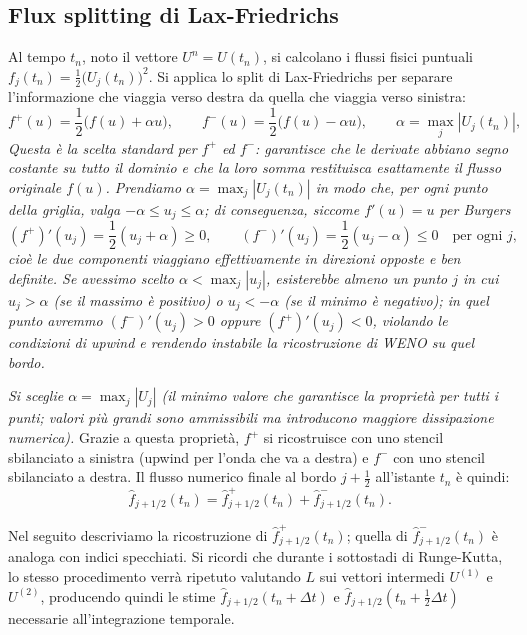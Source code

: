 \documentclass[12pt]{article}
\begin{document}
\subsection{Flux splitting di Lax-Friedrichs}

Al tempo \(t_n\), noto il vettore \(U^n = U(t_n)\), si calcolano i flussi fisici puntuali 
\(f_j(t_n)=\frac12\bigl(U_j(t_n)\bigr)^2\). 
Si applica lo split di Lax-Friedrichs per separare l'informazione che viaggia verso destra da quella che viaggia verso sinistra:
\[
f^+(u) = \frac12\bigl(f(u)+\alpha u\bigr), \qquad 
f^-(u) = \frac12\bigl(f(u)-\alpha u\bigr), \qquad 
\alpha=\max_j|U_j(t_n)|,
\]
\textit{Questa è la scelta standard per $f^+$ ed $f^-$: garantisce che le derivate abbiano segno costante su tutto il dominio e che la loro somma restituisca esattamente il flusso originale $f(u)$. Prendiamo $\alpha = \max_j |U_j(t_n)|$ in modo che, per ogni punto della griglia, valga $-\alpha \le u_j \le \alpha$; di conseguenza, siccome $f'(u)=u$ per Burgers}
\[
(f^+)'(u_j) = \frac{1}{2}(u_j+\alpha) \ge 0, \qquad (f^-)'(u_j) = \frac{1}{2}(u_j-\alpha) \le 0 \quad \text{per ogni } j,
\]
\textit{cioè le due componenti viaggiano effettivamente in direzioni opposte e ben definite. 
Se avessimo scelto $\alpha < \max_j |u_j|$, esisterebbe almeno un punto $j$ in cui $u_j > \alpha$ (se il massimo è positivo) o $u_j < -\alpha$ (se il minimo è negativo); in quel punto avremmo $(f^-)'(u_j) > 0$ oppure $(f^+)'(u_j) < 0$, violando le condizioni di upwind e rendendo instabile la ricostruzione di WENO su quel bordo.}

\textit{Si sceglie $\alpha = \max_j |U_j|$ (il minimo valore che garantisce la proprietà per tutti i punti; valori più grandi sono ammissibili ma introducono maggiore dissipazione numerica).}
Grazie a questa proprietà, \(f^+\) si ricostruisce con uno stencil sbilanciato a sinistra (upwind per l'onda che va a destra) e \(f^-\) con uno stencil sbilanciato a destra. 
Il flusso numerico finale al bordo \(j+\tfrac12\) all'istante \(t_n\) è quindi:
\[
\hat f_{j+1/2}(t_n)=\hat f^+_{j+1/2}(t_n)+\hat f^-_{j+1/2}(t_n).
\]


Nel seguito descriviamo la ricostruzione di \(\hat f^+_{j+1/2}(t_n)\); quella di \(\hat f^-_{j+1/2}(t_n)\) è analoga con indici specchiati. 
Si ricordi che durante i sottostadi di Runge-Kutta, lo stesso procedimento verrà ripetuto valutando \(L\) sui vettori intermedi \(U^{(1)}\) e \(U^{(2)}\), producendo quindi le stime \(\hat f_{j+1/2}(t_n+\Delta t)\) e \(\hat f_{j+1/2}(t_n+\tfrac12\Delta t)\) necessarie all'integrazione temporale.
\end{document}
